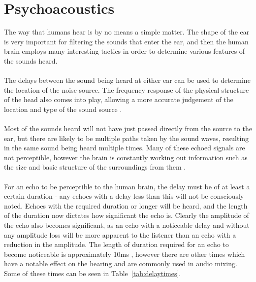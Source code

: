 \section{Psychoacoustics}
The way that humans hear is by no means a simple matter.
The shape of the ear is very important for filtering the sounds that enter the ear, and then the human brain employs many interesting tactics in order to determine various features of the sounds heard.
\\
\\
The delays between the sound being heard at either ear can be used to determine the location of the noise source.
The frequency response of the physical structure of the head also comes into play, allowing a more accurate judgement of the location and type of the sound source \cite{CogPsychMus}.
\\
\\
Most of the sounds heard will not have just passed directly from the source to the ear, but there are likely to be multiple paths taken by the sound waves, resulting in the same sound being heard multiple times.
Many of these echoed signals are not perceptible, however the brain is constantly working out information such as the size and basic structure of the surroundings from them \cite{CogPsychMus}.
\\
\\
For an echo to be perceptible to the human brain, the delay must be of at least a certain duration - any echoes with a delay less than this will not be consciously noted.
Echoes with the required duration or longer will be heard, and the length of the duration now dictates how significant the echo is.
Clearly the amplitude of the echo also becomes significant, as an echo with a noticeable delay and without any amplitude loss will be more apparent to the listener than an echo with a reduction in the amplitude.
The length of duration required for an echo to become noticeable is approximately 10ms \cite{TimeSpaceHearing}, however there are other times which have a notable effect on the hearing and are commonly used in audio mixing.
Some of these times can be seen in Table~\ref{tab:delaytimes}.

